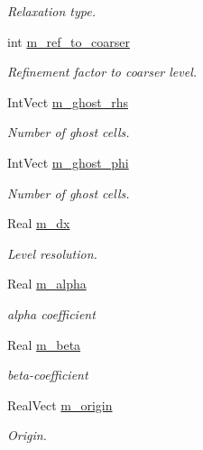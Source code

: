 \begin{DoxyCompactItemize}
\begin{DoxyCompactList}\small\item\em Relaxation type. \end{DoxyCompactList}\item 
int \hyperlink{classnwomfconductivityop_a0027b126df3299719608e457ab0ac22d}{m\+\_\+ref\+\_\+to\+\_\+coarser}
\begin{DoxyCompactList}\small\item\em Refinement factor to coarser level. \end{DoxyCompactList}\item 
Int\+Vect \hyperlink{classnwomfconductivityop_a398ed6241b4306f2aba557b1853f112f}{m\+\_\+ghost\+\_\+rhs}
\begin{DoxyCompactList}\small\item\em Number of ghost cells. \end{DoxyCompactList}\item 
Int\+Vect \hyperlink{classnwomfconductivityop_a46d6b000f62dc6a02da0a4c191534946}{m\+\_\+ghost\+\_\+phi}
\begin{DoxyCompactList}\small\item\em Number of ghost cells. \end{DoxyCompactList}\item 
Real \hyperlink{classnwomfconductivityop_af68ef11597075bdc23e41a769d19f8ec}{m\+\_\+dx}
\begin{DoxyCompactList}\small\item\em Level resolution. \end{DoxyCompactList}\item 
Real \hyperlink{classnwomfconductivityop_ad40e16f1014bc48ea34cd421cc6d924a}{m\+\_\+alpha}
\begin{DoxyCompactList}\small\item\em alpha coefficient \end{DoxyCompactList}\item 
Real \hyperlink{classnwomfconductivityop_acbd1939899583be5c9a159612649221e}{m\+\_\+beta}
\begin{DoxyCompactList}\small\item\em beta-\/coefficient \end{DoxyCompactList}\item 
Real\+Vect \hyperlink{classnwomfconductivityop_a52affc53f755c6175791dc4af2da1a6b}{m\+\_\+origin}
\begin{DoxyCompactList}\small\item\em Origin. \end{DoxyCompactList}\item 

\end{DoxyCompactItemize}
